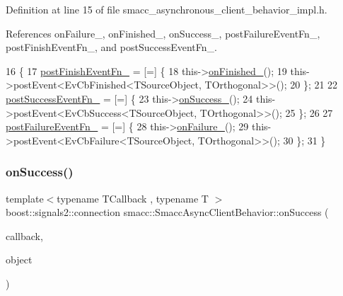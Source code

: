 Definition at line 15 of file smacc\+\_\+asynchronous\+\_\+client\+\_\+behavior\+\_\+impl.\+h.



References on\+Failure\+\_\+, on\+Finished\+\_\+, on\+Success\+\_\+, post\+Failure\+Event\+Fn\+\_\+, post\+Finish\+Event\+Fn\+\_\+, and post\+Success\+Event\+Fn\+\_\+.


\begin{DoxyCode}
16     \{
17         \hyperlink{classsmacc_1_1SmaccAsyncClientBehavior_af7a9ee952ba3fb8629aa55491606a7b2}{postFinishEventFn\_} = [=] \{
18             this->\hyperlink{classsmacc_1_1SmaccAsyncClientBehavior_a3b4f8bbacabffb8a37934407bc79ed80}{onFinished\_}();
19             this->postEvent<EvCbFinished<TSourceObject, TOrthogonal>>();
20         \};
21 
22         \hyperlink{classsmacc_1_1SmaccAsyncClientBehavior_a944ed10880796d53649bee39dc1299c0}{postSuccessEventFn\_} = [=] \{
23             this->\hyperlink{classsmacc_1_1SmaccAsyncClientBehavior_a31d8bdfa46fe70aea9adf0958806462b}{onSuccess\_}();
24             this->postEvent<EvCbSuccess<TSourceObject, TOrthogonal>>();
25         \};
26 
27         \hyperlink{classsmacc_1_1SmaccAsyncClientBehavior_a8041c43a0381f18fae6470a98eb9273d}{postFailureEventFn\_} = [=] \{
28             this->\hyperlink{classsmacc_1_1SmaccAsyncClientBehavior_a34e6262de21b9fbbabbc466d3180cc18}{onFailure\_}();
29             this->postEvent<EvCbFailure<TSourceObject, TOrthogonal>>();
30         \};
31     \}
\end{DoxyCode}
\mbox{\label{classsmacc_1_1SmaccAsyncClientBehavior_a48d8a07e7fc65220f1eeee49af02a82a}} 
\subsubsection{\texorpdfstring{on\+Success()}{onSuccess()}}
{\footnotesize\ttfamily template$<$typename T\+Callback , typename T $>$ \\
boost\+::signals2\+::connection smacc\+::\+Smacc\+Async\+Client\+Behavior\+::on\+Success (\begin{DoxyParamCaption}\item[{T\+Callback}]{callback,  }\item[{T $\ast$}]{object }\end{DoxyParamCaption})}



